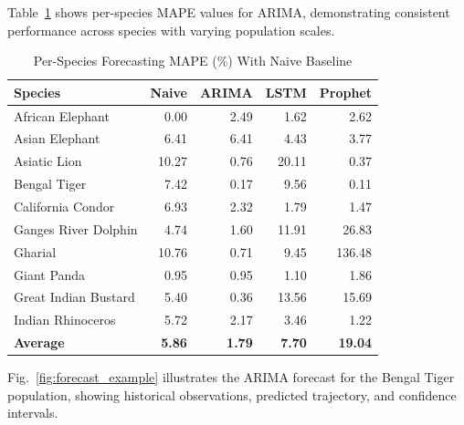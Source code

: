 \documentclass[conference]{IEEEtran}
\begin{document}
Table~\ref{tab:forecast_species} shows per-species MAPE values for ARIMA, demonstrating consistent performance across species with varying population scales.

\begin{table}[h]
\caption{Per-Species Forecasting MAPE (\%) With Naive Baseline}
\label{tab:forecast_species}
\centering
\footnotesize
\begin{tabular}{lrrrr}
\toprule
\textbf{Species} & \textbf{Naive} & \textbf{ARIMA} & \textbf{LSTM} & \textbf{Prophet} \\
\midrule
African Elephant & 0.00 & 2.49 & 1.62 & 2.62 \\
Asian Elephant & 6.41 & 6.41 & 4.43 & 3.77 \\
Asiatic Lion & 10.27 & 0.76 & 20.11 & 0.37 \\
Bengal Tiger & 7.42 & 0.17 & 9.56 & 0.11 \\
California Condor & 6.93 & 2.32 & 1.79 & 1.47 \\
Ganges River Dolphin & 4.74 & 1.60 & 11.91 & 26.83 \\
Gharial & 10.76 & 0.71 & 9.45 & 136.48 \\
Giant Panda & 0.95 & 0.95 & 1.10 & 1.86 \\
Great Indian Bustard & 5.40 & 0.36 & 13.56 & 15.69 \\
Indian Rhinoceros & 5.72 & 2.17 & 3.46 & 1.22 \\
\midrule
\textbf{Average} & \textbf{5.86} & \textbf{1.79} & \textbf{7.70} & \textbf{19.04} \\
\bottomrule
\end{tabular}
\end{table}

Fig.~\ref{fig:forecast_example} illustrates the ARIMA forecast for the Bengal Tiger population, showing historical observations, predicted trajectory, and confidence intervals.
\end{document}
